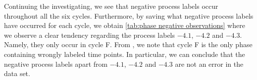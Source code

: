\documentclass[../Thesis.tex]{subfiles}
\begin{document}

Continuing the investigating, we see that negative process labels occur throughout all the six cycles. Furthermore, by saving what negative process labels have occurred for each cycle, we obtain \autoref{tab:phase negative observations} where we observe a clear tendency regarding the process labels $-4.1$, $-4.2$ and $-4.3$. Namely, they only occur in cycle F. From \cite{benchmark-model-to-generate-batch-process-data}, we note that cycle F is the only phase containing wrongly labeled time points. In particular, we can conclude that the negative process labels apart from $-4.1$, $-4.2$ and $-4.3$ are not an error in the data set.
\end{document}
